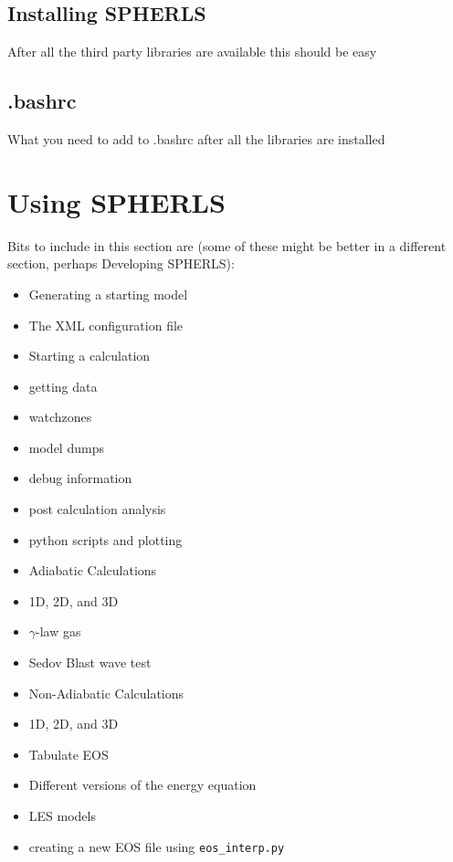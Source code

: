 \documentclass[12pt,a4paper]{book}
\begin{document}
\subsection{Installing SPHERLS}
After all the third party libraries are available this should be easy

\subsection{.bashrc}
What you need to add to .bashrc after all the libraries are installed

\section{Using SPHERLS}
Bits to include in this section are (some of these might be better in a different section, perhaps Developing SPHERLS):
\begin{itemize}
\item Generating a starting model
\item The XML configuration file
\item Starting a calculation
\item getting data
\item watchzones
\item model dumps
\item debug information
\item post calculation analysis
\item python scripts and plotting
\item Adiabatic Calculations
\item 1D, 2D, and 3D
\item $\gamma$-law gas
\item Sedov Blast wave test
\item Non-Adiabatic Calculations
\item 1D, 2D, and 3D
\item Tabulate EOS
\item Different versions of the energy equation
\item LES models
\item creating a new EOS file using {\tt eos\_interp.py}
\end{itemize}
\end{document}
